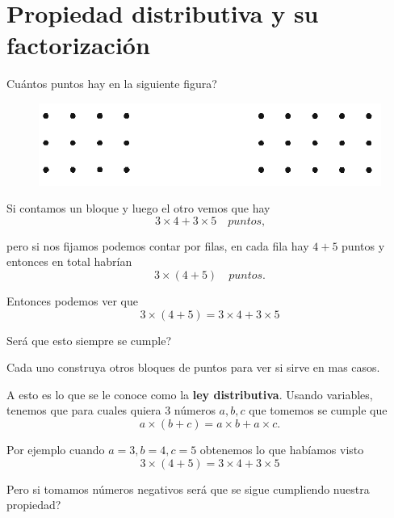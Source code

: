 \section{Propiedad distributiva y su factorización }\label{subsubsection_distributiva}
Cuántos puntos hay en la siguiente figura?
		\begin{figure}[H]
			\centering
			\includegraphics[width=0.7\linewidth]{Algebra/imgs/aopsALG_distributiva_dots}
			\label{aopsALG_distributiva_dots}
		\end{figure}
Si contamos un bloque y luego el otro vemos que hay
\[
			3\times 4 + 3\times 5 \quad \textit{puntos,}
\]

pero si nos fijamos podemos contar por filas, en cada fila hay $4+5$ puntos y entonces en total habrían
\[
		3\times (4+5) \quad \textit{puntos.}
\]

Entonces podemos ver que 
\[
		3\times (4+5) = 3\times 4 + 3\times 5
\]

Será que esto siempre se cumple?
\begin{exer}
 Cada uno construya otros bloques de puntos para ver si sirve en mas casos. 
\end{exer}

\begin{tcolorbox}[colback=red!5!white,colframe=red!75!black]
	A esto es lo que se le conoce como la \textbf{ley distributiva}. Usando variables, tenemos que para cuales quiera 3 números $a,b,c$ que tomemos se cumple que
	\[
	a\times(b+c) = a\times b + a\times c.
	\]
\end{tcolorbox}

Por ejemplo cuando $a=3,b=4,c=5$ obtenemos lo que habíamos visto
\[
3\times (4+5) = 3\times 4 + 3\times 5
\]

Pero si tomamos números negativos será que se sigue cumpliendo nuestra propiedad?

